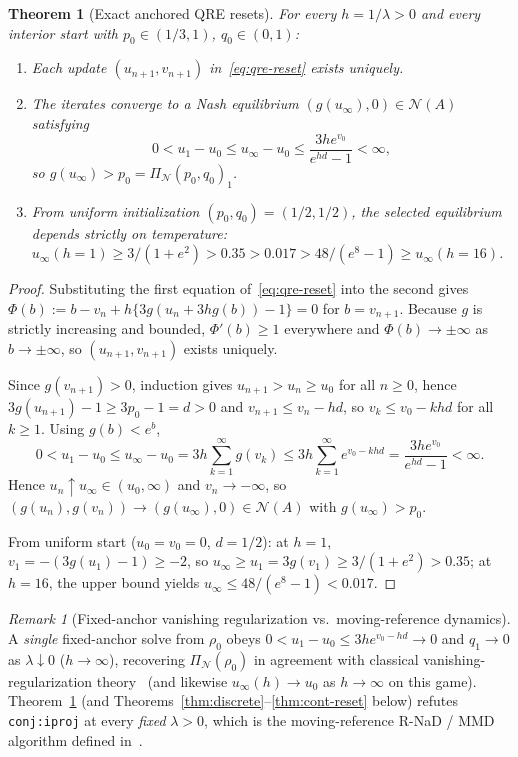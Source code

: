 \documentclass[11pt]{article}
\theoremstyle{plain}
\newtheorem{theorem}{Theorem}
\theoremstyle{definition}
\theoremstyle{remark}
\newtheorem{remark}{Remark}
\newcommand{\NE}{\mathcal{N}}
\begin{document}
\begin{theorem}[Exact anchored QRE resets]\label{thm:qre}
For every $h = 1/\lambda > 0$ and every interior start with $p_0 \in (1/3, 1)$, $q_0 \in (0, 1)$:
\begin{enumerate}[label=\textup{(\arabic*)}]
\item Each update $(u_{n+1}, v_{n+1})$ in~\eqref{eq:qre-reset} exists uniquely.
\item The iterates converge to a Nash equilibrium $(g(u_\infty), 0) \in \NE(A)$ satisfying
\[
0 < u_1 - u_0 \le u_\infty - u_0 \le \frac{3h e^{v_0}}{e^{hd} - 1} < \infty,
\]
so $g(u_\infty) > p_0 = \Pi_{\NE}(p_0, q_0)_1$.
\item From uniform initialization $(p_0, q_0) = (1/2, 1/2)$, the selected equilibrium depends strictly on temperature: $u_\infty(h = 1) \ge 3/(1 + e^2) > 0.35 > 0.017 > 48/(e^8 - 1) \ge u_\infty(h = 16)$.
\end{enumerate}
\end{theorem}

\begin{proof}
Substituting the first equation of~\eqref{eq:qre-reset} into the second gives $\Phi(b) := b - v_n + h\{3g(u_n + 3h g(b)) - 1\} = 0$ for $b = v_{n+1}$. Because $g$ is strictly increasing and bounded, $\Phi'(b) \ge 1$ everywhere and $\Phi(b) \to \pm\infty$ as $b \to \pm\infty$, so $(u_{n+1}, v_{n+1})$ exists uniquely.

Since $g(v_{n+1}) > 0$, induction gives $u_{n+1} > u_n \ge u_0$ for all $n \ge 0$, hence $3g(u_{n+1}) - 1 \ge 3p_0 - 1 = d > 0$ and $v_{n+1} \le v_n - hd$, so $v_k \le v_0 - khd$ for all $k \ge 1$. Using $g(b) < e^b$,
\[
0 < u_1 - u_0 \le u_\infty - u_0 = 3h\sum_{k=1}^\infty g(v_k) \le 3h\sum_{k=1}^\infty e^{v_0 - khd} = \frac{3h e^{v_0}}{e^{hd} - 1} < \infty.
\]
Hence $u_n \uparrow u_\infty \in (u_0, \infty)$ and $v_n \to -\infty$, so $(g(u_n), g(v_n)) \to (g(u_\infty), 0) \in \NE(A)$ with $g(u_\infty) > p_0$.

From uniform start ($u_0 = v_0 = 0$, $d = 1/2$): at $h = 1$, $v_1 = -(3g(u_1) - 1) \ge -2$, so $u_\infty \ge u_1 = 3g(v_1) \ge 3/(1 + e^2) > 0.35$; at $h = 16$, the upper bound yields $u_\infty \le 48/(e^8 - 1) < 0.017$.
\end{proof}

\begin{remark}[Fixed-anchor vanishing regularization vs.\ moving-reference dynamics]
A \emph{single} fixed-anchor solve from $\rho_0$ obeys $0 < u_1 - u_0 \le 3h e^{v_0 - hd} \to 0$ and $q_1 \to 0$ as $\lambda \downarrow 0$ ($h \to \infty$), recovering $\Pi_{\NE}(\rho_0)$ in agreement with classical vanishing-regularization theory~\cite{McKelveyPalfrey1995,Turocy2005,Cuturi2013,Weed2018} (and likewise $u_\infty(h) \to u_0$ as $h \to \infty$ on this game). Theorem~\ref{thm:qre} (and Theorems~\ref{thm:discrete}--\ref{thm:cont-reset} below) refutes \texttt{conj:iproj} at every \emph{fixed} $\lambda > 0$, which is the moving-reference R-NaD / MMD algorithm defined in~\cite{Leal2026}.
\end{remark}
\end{document}

